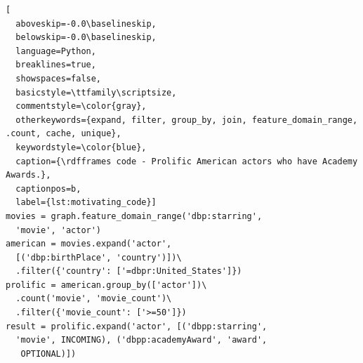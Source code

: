 



\vspace{8pt}
\begin{lstlisting}[
  aboveskip=-0.0\baselineskip,
  belowskip=-0.0\baselineskip,
  language=Python,
  breaklines=true,
  showspaces=false,
  basicstyle=\ttfamily\scriptsize,
  commentstyle=\color{gray},
  otherkeywords={expand, filter, group_by, join, feature_domain_range, .count, cache, unique},
  keywordstyle=\color{blue},
  caption={\rdfframes code - Prolific American actors who have Academy Awards.},
  captionpos=b,
  label={lst:motivating_code}]
movies = graph.feature_domain_range('dbp:starring',
  'movie', 'actor')
american = movies.expand('actor',
  [('dbp:birthPlace', 'country')])\
  .filter({'country': ['=dbpr:United_States']})
prolific = american.group_by(['actor'])\
  .count('movie', 'movie_count')\
  .filter({'movie_count': ['>=50']})
result = prolific.expand('actor', [('dbpp:starring',
  'movie', INCOMING), ('dbpp:academyAward', 'award',
   OPTIONAL)])
\end{lstlisting}

